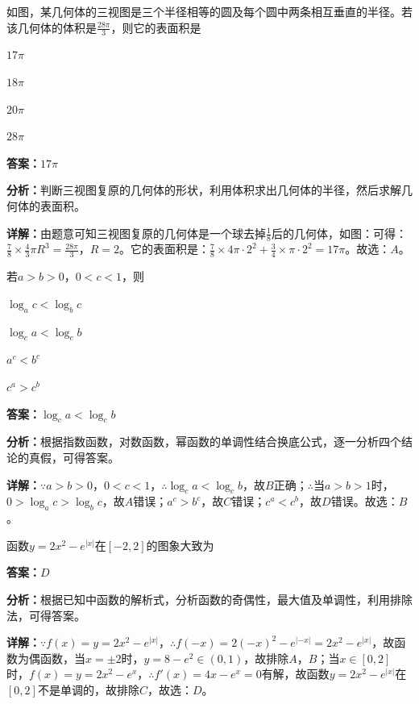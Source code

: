 \begin{question}[points=5]
如图，某几何体的三视图是三个半径相等的圆及每个圆中两条相互垂直的半径。若该几何体的体积是$\frac{28\pi}{3}$，则它的表面积是
\begin{choices}
  \item $17\pi$
  \item $18\pi$
  \item $20\pi$
  \item $28\pi$
\end{choices}
\begin{solution}
\textbf{答案：}$17\pi$

\textbf{分析：}判断三视图复原的几何体的形状，利用体积求出几何体的半径，然后求解几何体的表面积。

\textbf{详解：}由题意可知三视图复原的几何体是一个球去掉$\frac{1}{8}$后的几何体，如图：可得：$\frac{7}{8}\times\frac{4}{3}\pi R^3=\frac{28\pi}{3}$，$R=2$。它的表面积是：$\frac{7}{8}\times4\pi\cdot2^2+\frac{3}{4}\times\pi\cdot2^2=17\pi$。故选：$A$。
\end{solution}
\end{question}

\begin{question}[points=5]
若$a>b>0$，$0<c<1$，则
\begin{choices}
  \item $\log_ac<\log_bc$
  \item $\log_ca<\log_cb$
  \item $a^c<b^c$
  \item $c^a>c^b$
\end{choices}
\begin{solution}
\textbf{答案：}$\log_ca<\log_cb$

\textbf{分析：}根据指数函数，对数函数，幂函数的单调性结合换底公式，逐一分析四个结论的真假，可得答案。

\textbf{详解：}$\because a>b>0$，$0<c<1$，$\therefore \log_ca<\log_cb$，故$B$正确；$\therefore$当$a>b>1$时，$0>\log_ac>\log_bc$，故$A$错误；$a^c>b^c$，故$C$错误；$c^a<c^b$，故$D$错误。故选：$B$。
\end{solution}
\end{question}

\begin{question}[points=5]
函数$y=2x^2-e^{|x|}$在$[-2,2]$的图象大致为
\begin{choices}
\end{choices}
\begin{solution}
\textbf{答案：}$D$

\textbf{分析：}根据已知中函数的解析式，分析函数的奇偶性，最大值及单调性，利用排除法，可得答案。

\textbf{详解：}$\because f(x)=y=2x^2-e^{|x|}$，$\therefore f(-x)=2(-x)^2-e^{|-x|}=2x^2-e^{|x|}$，故函数为偶函数，当$x=\pm2$时，$y=8-e^2\in(0,1)$，故排除$A$，$B$；当$x\in[0,2]$时，$f(x)=y=2x^2-e^x$，$\therefore f'(x)=4x-e^x=0$有解，故函数$y=2x^2-e^{|x|}$在$[0,2]$不是单调的，故排除$C$，故选：$D$。
\end{solution}
\end{question}

